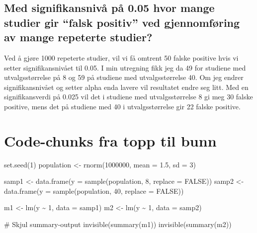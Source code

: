 \documentclass[
  letterpaper,
  DIV=11,
  numbers=noendperiod]{scrreprt}
\newenvironment{Shaded}{\begin{snugshade}}{\end{snugshade}}
\newcommand{\AttributeTok}[1]{\textcolor[rgb]{0.40,0.45,0.13}{#1}}
\newcommand{\CommentTok}[1]{\textcolor[rgb]{0.37,0.37,0.37}{#1}}
\newcommand{\ConstantTok}[1]{\textcolor[rgb]{0.56,0.35,0.01}{#1}}
\newcommand{\DecValTok}[1]{\textcolor[rgb]{0.68,0.00,0.00}{#1}}
\newcommand{\FloatTok}[1]{\textcolor[rgb]{0.68,0.00,0.00}{#1}}
\newcommand{\FunctionTok}[1]{\textcolor[rgb]{0.28,0.35,0.67}{#1}}
\newcommand{\NormalTok}[1]{\textcolor[rgb]{0.00,0.23,0.31}{#1}}
\newcommand{\OtherTok}[1]{\textcolor[rgb]{0.00,0.23,0.31}{#1}}
\newcommand{\SpecialCharTok}[1]{\textcolor[rgb]{0.37,0.37,0.37}{#1}}
\begin{document}
\subsection{Med signifikansnivå på 0.05 hvor mange studier gir ``falsk
positiv'' ved gjennomføring av mange repeterte
studier?}\label{med-signifikansnivuxe5-puxe5-0.05-hvor-mange-studier-gir-falsk-positiv-ved-gjennomfuxf8ring-av-mange-repeterte-studier}

Ved å gjøre 1000 repeterte studier, vil vi få omtrent 50 falske positive
hvis vi setter signifikansnivået til 0.05. I min utregning fikk jeg da
49 for studiene med utvalgsstørrelse på 8 og 59 på studiene med
utvalgsstørrelse 40. Om jeg endrer signifikansnivået og setter alpha
enda lavere vil resultatet endre seg litt. Med en signifikansverdi på
0.025 vil det i studiene med utvalgsstørrelse 8 gi meg 30 falske
positive, mens det på studiene med 40 i utvalgsstørrelse gir 22 falske
positive.

\section{Code-chunks fra topp til
bunn}\label{code-chunks-fra-topp-til-bunn}

\begin{Shaded}
\begin{Highlighting}[]
\FunctionTok{set.seed}\NormalTok{(}\DecValTok{1}\NormalTok{)}
\NormalTok{population }\OtherTok{\textless{}{-}} \FunctionTok{rnorm}\NormalTok{(}\DecValTok{1000000}\NormalTok{, }\AttributeTok{mean =} \FloatTok{1.5}\NormalTok{, }\AttributeTok{sd =} \DecValTok{3}\NormalTok{)}

\NormalTok{samp1 }\OtherTok{\textless{}{-}} \FunctionTok{data.frame}\NormalTok{(}\AttributeTok{y =} \FunctionTok{sample}\NormalTok{(population, }\DecValTok{8}\NormalTok{, }\AttributeTok{replace =} \ConstantTok{FALSE}\NormalTok{))}
\NormalTok{samp2 }\OtherTok{\textless{}{-}} \FunctionTok{data.frame}\NormalTok{(}\AttributeTok{y =} \FunctionTok{sample}\NormalTok{(population, }\DecValTok{40}\NormalTok{, }\AttributeTok{replace =} \ConstantTok{FALSE}\NormalTok{))}

\NormalTok{m1 }\OtherTok{\textless{}{-}} \FunctionTok{lm}\NormalTok{(y }\SpecialCharTok{\textasciitilde{}} \DecValTok{1}\NormalTok{, }\AttributeTok{data =}\NormalTok{ samp1)}
\NormalTok{m2 }\OtherTok{\textless{}{-}} \FunctionTok{lm}\NormalTok{(y }\SpecialCharTok{\textasciitilde{}} \DecValTok{1}\NormalTok{, }\AttributeTok{data =}\NormalTok{ samp2)}

\CommentTok{\# Skjul summary{-}output}
\FunctionTok{invisible}\NormalTok{(}\FunctionTok{summary}\NormalTok{(m1))}
\FunctionTok{invisible}\NormalTok{(}\FunctionTok{summary}\NormalTok{(m2))}
\end{Highlighting}
\end{Shaded}
\end{document}
